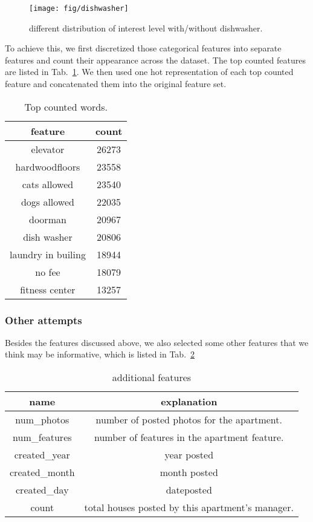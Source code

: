 \documentclass{article} %
\begin{document}
\begin{figure}[H]
	\centering
	\texttt{[image: fig/dishwasher]}
	\caption{different distribution of interest level with/without dishwasher.}
	\label{fig:dishwasher}
\end{figure}

To achieve this, we first discretized those categorical features into separate features and count their appearance across the dataset. The top counted features are listed in Tab.~\ref{tab:ft-count}. We then used one hot representation of each top counted feature and concatenated them into the original feature set.
\begin{table}[H]
	\centering
	\begin{tabular}{cc}
	feature			&	count \\ \hline \hline
	elevator		&	26273 \\
	hardwoodfloors	&	23558 \\
	cats allowed	&	23540 \\
	dogs allowed	&	22035 \\
	doorman			&	20967 \\
	dish washer		&	20806 \\
	laundry in builing	&	18944 \\
	no fee	&	18079 \\
	fitness center	&	13257 \\
	\end{tabular}
	\caption{Top counted words.}
	\label{tab:ft-count}
\end{table}

\subsubsection{Other attempts}
Besides the features discussed above, we also selected some other features that we think may be informative, which is listed in Tab.~\ref{tab:other-ft}

\begin{table}[H]
	\centering
	\begin{tabular}{cc}
		name	& explanation \\ \hline \hline
		num\_photos	&	number of posted photos for the apartment. \\
		num\_features	& number of features in the apartment feature. \\
		created\_year	& year posted \\
		created\_month	& month posted \\
		created\_day		& dateposted \\
		count			& total houses posted by this apartment's manager.
	\end{tabular}
	\caption{additional features}
	\label{tab:other-ft}
\end{table}
\end{document}
